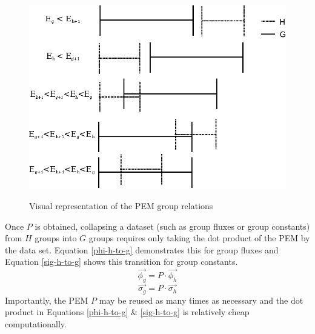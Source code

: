 \documentclass{article}
\begin{document}
\begin{figure}
\caption{Visual representation of the PEM group relations}
\includegraphics[scale=1.2]{structure.eps}
\label{fig:bin_graph}
\end{figure}
Once $P$ is obtained, collapsing a dataset (such as group fluxes or group constants) from $H$
groups into $G$ groups requires only taking the dot product of the PEM
by the data set. Equation \ref{phi-h-to-g} demonstrates this for group fluxes and Equation
\ref{sig-h-to-g} shows this transition for group constants.
\begin{equation}
\label{phi-h-to-g}
\vec{\phi_g} = P \cdot \vec{\phi_h}
\end{equation}
\begin{equation}
\label{sig-h-to-g}
\vec{\sigma_g} = P \cdot \vec{\sigma_h}
\end{equation}
Importantly, the PEM $P$ may be reused as many times as necessary and the dot product in
Equations \ref{phi-h-to-g} \& \ref{sig-h-to-g} is relatively cheap computationally.
\end{document}
